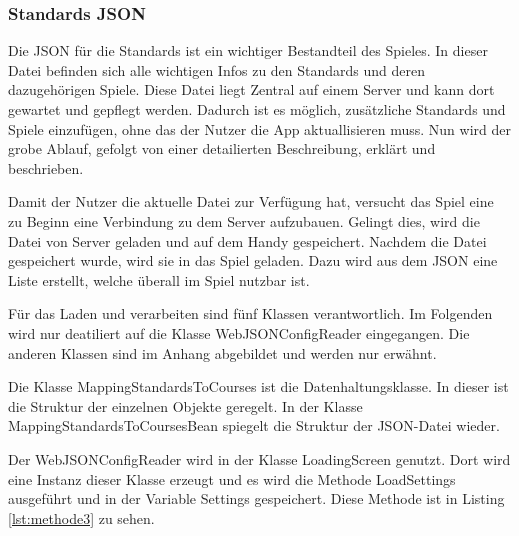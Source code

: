 \subsubsection{Standards JSON}
Die JSON für die Standards ist ein wichtiger Bestandteil des Spieles. In dieser Datei befinden sich alle wichtigen Infos zu den Standards und deren dazugehörigen Spiele. Diese Datei liegt Zentral auf einem Server und kann dort gewartet und gepflegt werden. Dadurch ist es möglich, zusätzliche Standards und Spiele einzufügen, ohne das der Nutzer die App aktuallisieren muss. Nun wird der grobe Ablauf, gefolgt von einer detailierten Beschreibung, erklärt und beschrieben.
	
			Damit der Nutzer die aktuelle Datei zur Verfügung hat, versucht das Spiel eine zu Beginn eine Verbindung zu dem Server aufzubauen. Gelingt dies, wird die Datei von Server geladen und auf dem Handy gespeichert. Nachdem die Datei gespeichert wurde, wird sie in das Spiel geladen. Dazu wird aus dem JSON eine Liste erstellt, welche überall im Spiel nutzbar ist.
	
			Für das Laden und verarbeiten sind fünf Klassen verantwortlich. Im Folgenden wird nur deatiliert auf die Klasse WebJSONConfigReader eingegangen. Die anderen Klassen sind im Anhang abgebildet und werden nur erwähnt.
	
			Die Klasse MappingStandardsToCourses ist die Datenhaltungsklasse. In dieser ist die Struktur der einzelnen Objekte geregelt. In der Klasse MappingStandardsToCoursesBean spiegelt die Struktur der JSON-Datei wieder. 
	
			Der WebJSONConfigReader wird in der Klasse LoadingScreen genutzt. Dort wird eine Instanz dieser Klasse erzeugt und es wird die Methode LoadSettings ausgeführt und in der Variable Settings gespeichert. Diese Methode ist in Listing \ref{lst:methode3} zu sehen.

